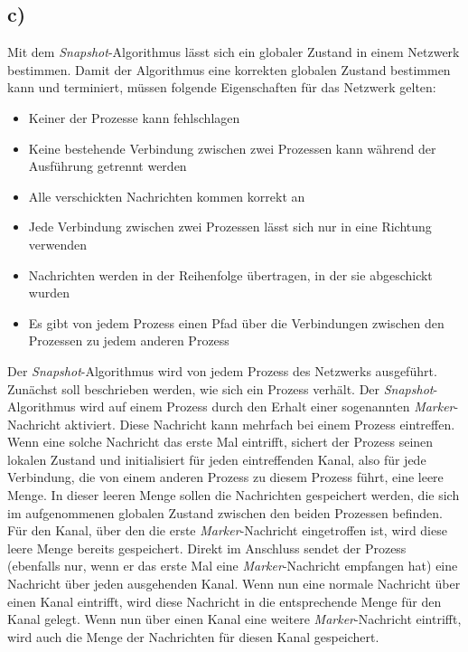 \documentclass[ngerman]{fbi-aufgabenblatt}
\begin{document}
\subsection*{c)}
Mit dem \textit{Snapshot}-Algorithmus lässt sich ein globaler Zustand in einem Netzwerk bestimmen. Damit der Algorithmus eine korrekten globalen Zustand bestimmen kann und terminiert, müssen folgende Eigenschaften für das Netzwerk gelten:
\begin{itemize}
	\item Keiner der Prozesse kann fehlschlagen
	\item Keine bestehende Verbindung zwischen zwei Prozessen kann während der Ausführung getrennt werden
	\item Alle verschickten Nachrichten kommen korrekt an
	\item Jede Verbindung zwischen zwei Prozessen lässt sich nur in eine Richtung verwenden
	\item Nachrichten werden in der Reihenfolge übertragen, in der sie abgeschickt wurden
	\item Es gibt von jedem Prozess einen Pfad über die Verbindungen zwischen den Prozessen zu jedem anderen Prozess
\end{itemize}
Der \textit{Snapshot}-Algorithmus wird von jedem Prozess des Netzwerks ausgeführt. Zunächst soll beschrieben werden, wie sich ein Prozess verhält. Der \textit{Snapshot}-Algorithmus wird auf einem Prozess durch den Erhalt einer sogenannten \textit{Marker}-Nachricht aktiviert. Diese Nachricht kann mehrfach bei einem Prozess eintreffen. Wenn eine solche Nachricht das erste Mal eintrifft, sichert der Prozess seinen lokalen Zustand und initialisiert für jeden eintreffenden Kanal, also für jede Verbindung, die von einem anderen Prozess zu diesem Prozess führt, eine leere Menge. In dieser leeren Menge sollen die Nachrichten gespeichert werden, die sich im aufgenommenen globalen Zustand zwischen den beiden Prozessen befinden. Für den Kanal, über den die erste \textit{Marker}-Nachricht eingetroffen ist, wird diese leere Menge bereits gespeichert. Direkt im Anschluss sendet der Prozess (ebenfalls nur, wenn er das erste Mal eine \textit{Marker}-Nachricht empfangen hat) eine Nachricht über jeden ausgehenden Kanal. Wenn nun eine normale Nachricht über einen Kanal eintrifft, wird diese Nachricht in die entsprechende Menge für den Kanal gelegt. Wenn nun über einen Kanal eine weitere \textit{Marker}-Nachricht eintrifft, wird auch die Menge der Nachrichten für diesen Kanal gespeichert. \\
\\
\end{document}
